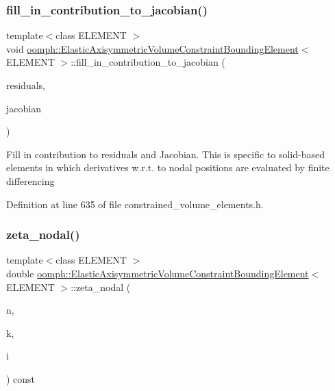 \subsubsection{\texorpdfstring{fill\+\_\+in\+\_\+contribution\+\_\+to\+\_\+jacobian()}{fill\_in\_contribution\_to\_jacobian()}}
{\footnotesize\ttfamily template$<$class E\+L\+E\+M\+E\+NT $>$ \\
void \hyperlink{classoomph_1_1ElasticAxisymmetricVolumeConstraintBoundingElement}{oomph\+::\+Elastic\+Axisymmetric\+Volume\+Constraint\+Bounding\+Element}$<$ E\+L\+E\+M\+E\+NT $>$\+::fill\+\_\+in\+\_\+contribution\+\_\+to\+\_\+jacobian (\begin{DoxyParamCaption}\item[{Vector$<$ double $>$ \&}]{residuals,  }\item[{Dense\+Matrix$<$ double $>$ \&}]{jacobian }\end{DoxyParamCaption})\hspace{0.3cm}{\ttfamily [inline]}}

Fill in contribution to residuals and Jacobian. This is specific to solid-\/based elements in which derivatives w.\+r.\+t. to nodal positions are evaluated by finite differencing 

Definition at line 635 of file constrained\+\_\+volume\+\_\+elements.\+h.

\mbox{\label{classoomph_1_1ElasticAxisymmetricVolumeConstraintBoundingElement_a8fe8843e542a626dd374cc4cd6850bcb}} 
\subsubsection{\texorpdfstring{zeta\+\_\+nodal()}{zeta\_nodal()}}
{\footnotesize\ttfamily template$<$class E\+L\+E\+M\+E\+NT $>$ \\
double \hyperlink{classoomph_1_1ElasticAxisymmetricVolumeConstraintBoundingElement}{oomph\+::\+Elastic\+Axisymmetric\+Volume\+Constraint\+Bounding\+Element}$<$ E\+L\+E\+M\+E\+NT $>$\+::zeta\+\_\+nodal (\begin{DoxyParamCaption}\item[{const unsigned \&}]{n,  }\item[{const unsigned \&}]{k,  }\item[{const unsigned \&}]{i }\end{DoxyParamCaption}) const\hspace{0.3cm}{\ttfamily [inline]}}



